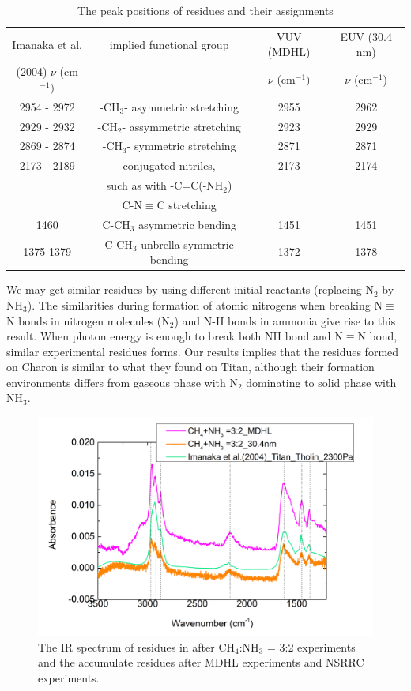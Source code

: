 \begin{table}[htbp]
\caption{The peak positions of residues and their assignments}
\label{tab:residue}
\begin{tabular}{cccc}
\hline
\hline
Imanaka et al. & implied functional group & VUV (MDHL) & EUV (30.4 nm)\\
(2004) $\nu$ (cm$^{-1})$ & & $\nu$ (cm$^{-1})$ & $\nu$ (cm$^{-1}$) \\
\hline
2954 - 2972 & -CH$_3$- asymmetric stretching & 2955 & 2962 \\
2929 - 2932 & -CH$_2$- assymmetric stretching & 2923 & 2929 \\
2869 - 2874 & -CH$_3$- symmetric stretching & 2871 & 2871 \\
2173 - 2189 & conjugated nitriles, & 2173 & 2174 \\
 & such as with -C=C(-NH$_2$)& & \\
 & C-N$\equiv$C stretching& & \\
1460 & C-CH$_3$ asymmetric bending & 1451 & 1451 \\
1375-1379 & C-CH$_3$ unbrella symmetric bending & 1372 & 1378 \\
\hline
\end{tabular}
\end{table}

We may get similar residues by using different initial reactants (replacing N$_2$ by NH$_3$). The similarities during formation of atomic nitrogens when breaking N$\equiv$N bonds in nitrogen molecules (N$_2$) and N-H bonds in ammonia give rise to this result. When photon energy is enough to break both NH bond and N$\equiv$N bond, similar experimental residues forms. Our results implies that the residues formed on Charon is similar to what they found on Titan, although their formation environments differs from gaseous phase with N$_2$ dominating to solid phase with NH$_3$.\\

\begin{figure}
\centering
\includegraphics[width=\textwidth]{figures/chapter3/residue.png}
\caption{The IR spectrum of residues in after CH$_4$:NH$_3$ = 3:2 experiments and the accumulate residues after MDHL experiments and NSRRC experiments.}
\label{fig:residues}
\end{figure}


